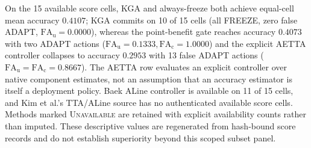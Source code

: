 On the 15 available score cells, KGA and always-freeze both achieve equal-cell mean accuracy $0.4107$;
KGA commits on 10 of 15 cells (all FREEZE, zero false ADAPT, $\mathrm{FA}_{\mathrm u} = 0.0000$), whereas
the point-benefit gate reaches accuracy $0.4073$ with two ADAPT actions ($\mathrm{FA}_{\mathrm u} = 0.1333,
\mathrm{FA}_{\mathrm c} = 1.0000$) and the explicit AETTA controller collapses to accuracy $0.2953$ with 13
false ADAPT actions ($\mathrm{FA}_{\mathrm u} = \mathrm{FA}_{\mathrm c} = 0.8667$). The AETTA row evaluates
an explicit controller over native component estimates, not an assumption that an accuracy estimator is
itself a deployment policy. Baek ALine controller is available on 11 of 15 cells, and Kim et al.'s TTA/ALine
source has no authenticated available score cells. Methods marked \textsc{Unavailable} are retained with
explicit availability counts rather than imputed. These descriptive values are regenerated from hash-bound
score records and do not establish superiority beyond this scoped subset panel.


